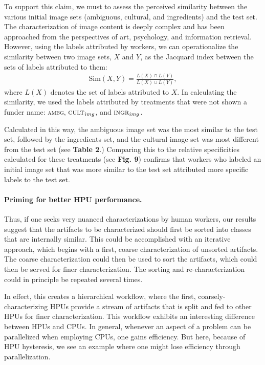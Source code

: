 \documentclass[a4paper]{report}
\begin{document}
To support this
claim, we must to assess the perceived similarity between the various 
initial image sets (ambiguous, cultural, and ingredients) and the test set.  
The characterization of image content is deeply complex and has been 
approached from the perspectives of 
art\cite{panofsky1939studies,shatford1986analyzing},
psychology\cite{Tversky1977327}, and information retrieval\cite{Jaimes20002}.  
However, using the labels attributed by workers, we can operationalize
the similarity between two image sets, $X$ and $Y$, as the Jacquard index 
between the sets of labels attributed to them:
\begin{align}
	\text{Sim}(X,Y) = \frac{L(X) \cap L(Y)}{L(X) \cup L(Y)},
\end{align}
where $L(X)$ denotes the set of labels attributed to $X$.  In calculating
the similarity, we used the labels attributed by treatments that were not 
shown a funder name:  \textsc{ambg}, $\textsc{cult}_{img}$, and 
$\textsc{ingr}_{img}$.

Calculated in this way, the ambiguous image set was the most similar to the 
test set, followed by the ingredients set, and the cultural image set
was most different from the test set (see \textbf{Table 2}.)  Comparing
this to the relative specificities calculated for these treatments 
(see \textbf{Fig. 9}) confirms that workers who labeled an initial 
image set that was more similar to the test set attributed more specific 
labels to the test set.

\paragraph{Priming for better HPU performance.}
Thus, if one seeks very nuanced characterizations by human workers, 
our results suggest that the artifacts to be characterized should first 
be sorted into classes that are internally similar. This could be accomplished 
with an iterative approach, which begins with a first, coarse 
characterization of unsorted artifacts. The coarse characterization could then 
be used to sort the artifacts, which could then be served for finer 
characterization.  The sorting and re-characterization could in principle be
repeated several times.

In effect, this creates a hierarchical workflow, where the first, 
coarsely-characterizing HPUs provide a stream of artifacts that is split and 
fed to other HPUs for finer characterization.  This workflow exhibits an 
interesting difference between HPUs and CPUs.  In general,
whenever an aspect of a problem can be parallelized when employing CPUs, one
gains efficiency.  But here, because of HPU hysteresis, we see an example where
one might lose efficiency through parallelization.
\end{document}
